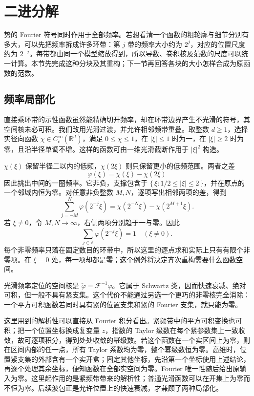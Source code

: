 \section{二进分解}
\label{b2:sec:1903}

势的 Fourier 符号同时作用于全部频率。若想看清一个函数的粗轮廓与细节分别有多大，可以先把频率拆成许多环带：第 \(j\) 带的频率大小约为 \(2^j\)，对应的位置尺度约为 \(2^{-j}\)。每带都由同一个模型缩放得到，所以导数、卷积核及范数的尺度可以统一计算。本节先完成这种分块及其重构；下一节再回答各块的大小怎样合成为原函数的范数。

\subsection{频率局部化}
\label{b2:subsec:190301}

直接乘环带的示性函数虽然能精确切开频率，却在环带边界产生不光滑的符号，其空间核未必可积。我们改用光滑过渡，并允许相邻频带重叠。取整数 \(d\geq1\)，选择实径向函数 \(\chi\in C_c^\infty(\mathbb R^d)\)，满足 \(0\leq\chi\leq1\)，在 \(|\xi|\leq1\) 时为一，在 \(|\xi|\geq2\) 时为零，且沿半径单调不增。这样的函数可由一维光滑截断作用于 \(|\xi|^2\) 构造。

\ProseParagraphBreak

\(\chi(\xi)\) 保留半径二以内的低频，\(\chi(2\xi)\) 则只保留更小的低频范围。两者之差
\[
 \varphi(\xi)=\chi(\xi)-\chi(2\xi)
\]
因此挑出中间的一圈频率。它非负，支撑包含于 \(\{\,\xi:1/2\leq|\xi|\leq2\,\}\)，并在原点的一个邻域内恒为零。对任意非负整数 \(M,N\)，逐项写出相邻两项的差，得到
\begin{equation}\label{b2:eq:19-dyadic-telescope}
 \sum_{j=-M}^N\varphi(2^{-j}\xi)
 =\chi(2^{-N}\xi)-\chi(2^{M+1}\xi).
\end{equation}
若 \(\xi\ne0\)，令 \(M,N\to\infty\)，右侧两项分别趋于一与零。因此
\[
 \sum_{j\in\mathbb Z}\varphi(2^{-j}\xi)=1
 \quad(\xi\ne0).
\]
每个非零频率只落在固定数目的环带中，所以这里的逐点求和实际上只有有限个非零项。在 \(\xi=0\) 处，每一项却都是零；这个例外将决定齐次重构需要什么函数空间。

\ProseParagraphBreak

光滑频率定位的空间核是 \(\check\varphi=\mathcal F^{-1}\varphi\)。它属于 Schwartz 类，因而快速衰减、绝对可积，但一般不具有紧支集。这个代价不能通过另选一个更巧的非零核完全消除：一个平方可积函数若同时具有紧的位置支集和紧的 Fourier 支集，就只能为零。

\ProseParagraphBreak

这里用到的解析性可以直接从 Fourier 积分看出。紧频带中的平方可积变换也可积；把一个位置坐标换成复变量 \(z\)，指数的 Taylor 级数在每个紧参数集上一致收敛，故可逐项积分，得到处处收敛的幂级数。若这个函数在一个实区间上为零，则在区间内部的任一点，所有 Taylor 系数均为零，整个幂级数恒为零。高维时，位置紧支集的外部含有一个实开盒；固定其他坐标，先沿第一个坐标使用上述结论，再逐个处理其余坐标，便知函数在全部实空间为零。Fourier 唯一性随后给出原输入为零。这里起作用的是紧频带带来的解析性；普通光滑函数可以在开集上为零而不恒为零。后续波包正是允许位置上的快速衰减，才兼顾了两种局部化。

